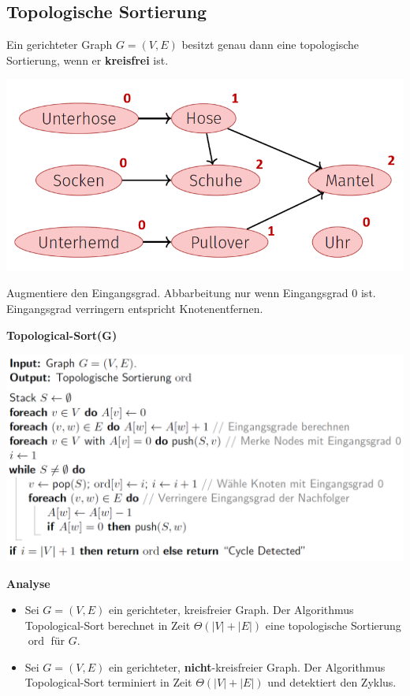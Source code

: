 \begin{sectionbox}
\subsection{Topologische Sortierung}\smallskip
\begin{greenbox}
Ein gerichteter Graph $G=(V, E)$ besitzt genau dann eine topologische Sortierung, wenn er \textbf{kreisfrei} ist.
\end{greenbox}\smallskip

\begin{center}
    \includegraphics[width = 0.9\columnwidth]{../img/topoSort.png}
\end{center}\par\smallskip
Augmentiere den Eingangsgrad. Abbarbeitung nur wenn Eingangsgrad $0$ ist. Eingangsgrad verringern entspricht Knotenentfernen.\par\smallskip

\textbf{Topological-Sort(G)}\par
\includegraphics[width = \columnwidth]{../img/topoSortG.png}\par\smallskip

\textbf{Analyse}\par
\begin{itemize}
    \item Sei $G=(V, E)$ ein gerichteter, kreisfreier Graph. Der Algorithmus Topological-Sort berechnet in Zeit $\Theta(|V|+|E|)$ eine topologische Sortierung $\operatorname{ord}$ für $G$.
    \item Sei $G=(V, E)$ ein gerichteter, \textbf{nicht}-kreisfreier Graph. Der Algorithmus Topological-Sort terminiert in Zeit $\Theta(|V|+|E|)$ und detektiert den Zyklus.
\end{itemize}

\end{sectionbox}

